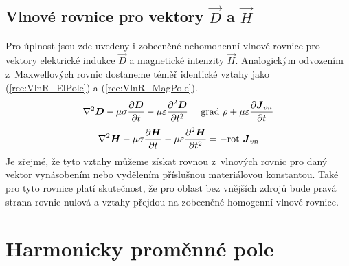 \subsection*{Vlnové rovnice pro vektory $\vec D$ a $\vec H$}
Pro úplnost jsou zde uvedeny i zobecněné nehomohenní vlnové rovnice pro vektory elektrické indukce $\vec D$ a magnetické intenzity $\vec H$. Analogickým odvozením z~Maxwellových rovnic dostaneme téměř identické vztahy jako (\ref{rce:VlnR_ElPole}) a (\ref{rce:VlnR_MagPole}). 
\begin{displaymath}
	\nabla^{2}\mbox{\boldmath$D$} -\mu\sigma\frac{\partial\mbox{\boldmath$D$}}{\partial t}-\mu\varepsilon\frac{\partial^{2}\mbox{\boldmath$D$}}{\partial t^{2}} = \mathrm{grad}\ \rho + \mu\varepsilon\frac{\partial\mbox{\boldmath$J$}_{vn}}{\partial t}
\end{displaymath}
\begin{displaymath}
	\nabla^{2}\mbox{\boldmath$H$} -\mu\sigma\frac{\partial\mbox{\boldmath$H$}}{\partial t}-\mu\varepsilon\frac{\partial^{2}\mbox{\boldmath$H$}}{\partial t^{2}}= -\mathrm{rot}\ \mbox{\boldmath$J$}_{vn}
\end{displaymath}
Je zřejmé, že tyto vztahy můžeme získat rovnou z~vlnových rovnic pro daný vektor vynásobením nebo vydělením příslušnou materiálovou konstantou. Také pro tyto rovnice platí skutečnost, že pro oblast bez vnějších zdrojů bude pravá strana rovnic nulová a vztahy přejdou na zobecněné homogenní vlnové rovnice.

\section{Harmonicky proměnné pole} \label{sec:Odvozeni_HarmPole}

